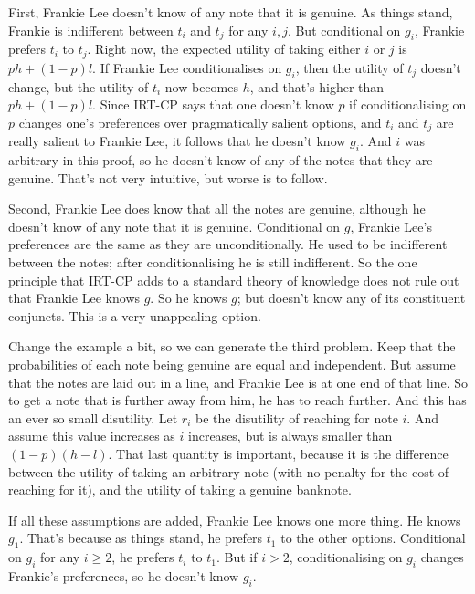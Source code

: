 \documentclass[
  12pt,
]{article}
\begin{document}
First, Frankie Lee doesn't know of any note that it is genuine. As things stand, Frankie is indifferent between \(t_i\) and \(t_j\) for any \(i, j\). But conditional on \(g_i\), Frankie prefers \(t_i\) to \(t_j\). Right now, the expected utility of taking either \(i\) or \(j\) is \(ph + (1-p)l\). If Frankie Lee conditionalises on \(g_i\), then the utility of \(t_j\) doesn't change, but the utility of \(t_i\) now becomes \(h\), and that's higher than \(ph + (1-p)l\). Since IRT-CP says that one doesn't know \(p\) if conditionalising on \(p\) changes one's preferences over pragmatically salient options, and \(t_i\) and \(t_j\) are really salient to Frankie Lee, it follows that he doesn't know \(g_i\). And \(i\) was arbitrary in this proof, so he doesn't know of any of the notes that they are genuine. That's not very intuitive, but worse is to follow.

Second, Frankie Lee does know that all the notes are genuine, although he doesn't know of any note that it is genuine. Conditional on \(g\), Frankie Lee's preferences are the same as they are unconditionally. He used to be indifferent between the notes; after conditionalising he is still indifferent. So the one principle that IRT-CP adds to a standard theory of knowledge does not rule out that Frankie Lee knows \(g\). So he knows \(g\); but doesn't know any of its constituent conjuncts. This is a very unappealing option.

Change the example a bit, so we can generate the third problem. Keep that the probabilities of each note being genuine are equal and independent. But assume that the notes are laid out in a line, and Frankie Lee is at one end of that line. So to get a note that is further away from him, he has to reach further. And this has an ever so small disutility. Let \(r_i\) be the disutility of reaching for note \(i\). And assume this value increases as \(i\) increases, but is always smaller than \((1-p)(h-l)\). That last quantity is important, because it is the difference between the utility of taking an arbitrary note (with no penalty for the cost of reaching for it), and the utility of taking a genuine banknote.

If all these assumptions are added, Frankie Lee knows one more thing. He knows \(g_1\). That's because as things stand, he prefers \(t_1\) to the other options. Conditional on \(g_i\) for any \(i \geq 2\), he prefers \(t_i\) to \(t_1\). But if \(i > 2\), conditionalising on \(g_i\) changes Frankie's preferences, so he doesn't know \(g_i\).
\end{document}
